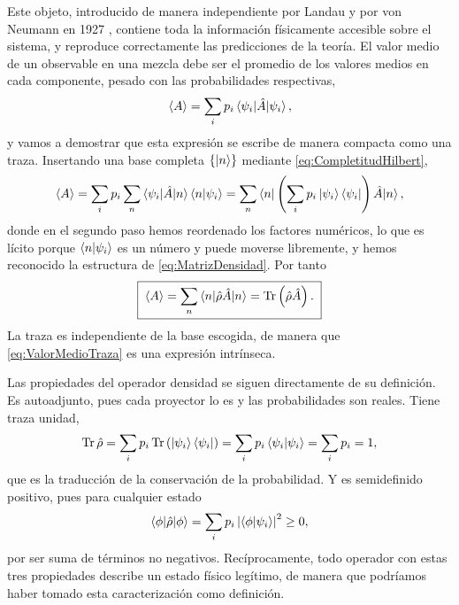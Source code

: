         Este objeto, introducido de manera independiente por Landau y por von Neumann en 1927 \citep{landau1927dampfungsproblem, vonneumann1927wahrscheinlichkeitstheoretischer}, contiene toda la información físicamente accesible sobre el sistema, y reproduce correctamente las predicciones de la teoría. El valor medio de un observable en una mezcla debe ser el promedio de los valores medios en cada componente, pesado con las probabilidades respectivas,
        \begin{equation}\label{eq:ValorMedioMezcla1}
            \left\langle A\right\rangle = \sum_{i}p_{i}\braket{\psi_{i}|\hat{A}|\psi_{i}},
        \end{equation}
        y vamos a demostrar que esta expresión se escribe de manera compacta como una traza. Insertando una base completa $\{\ket{n}\}$ mediante \eqref{eq:CompletitudHilbert},
        \begin{equation}\label{eq:ValorMedioMezcla2}
            \left\langle A\right\rangle = \sum_{i}p_{i}\sum_{n}\braket{\psi_{i}|\hat{A}|n}\braket{n|\psi_{i}}
            = \sum_{n}\braket{n|\left(\sum_{i}p_{i}\ket{\psi_{i}}\bra{\psi_{i}}\right)\hat{A}|n},
        \end{equation}
        donde en el segundo paso hemos reordenado los factores numéricos, lo que es lícito porque $\braket{n|\psi_{i}}$ es un número y puede moverse libremente, y hemos reconocido la estructura de \eqref{eq:MatrizDensidad}. Por tanto
        \begin{equation}\label{eq:ValorMedioTraza}
            \boxed{\;\left\langle A\right\rangle = \sum_{n}\braket{n|\hat{\rho}\hat{A}|n} = \mathrm{Tr}\left(\hat{\rho}\hat{A}\right) .\;}
        \end{equation}
        La traza es independiente de la base escogida, de manera que \eqref{eq:ValorMedioTraza} es una expresión intrínseca.

        Las propiedades del operador densidad se siguen directamente de su definición. Es autoadjunto, pues cada proyector lo es y las probabilidades son reales. Tiene traza unidad,
        \begin{equation}\label{eq:TrazaUno}
            \mathrm{Tr}\,\hat{\rho} = \sum_{i}p_{i}\,\mathrm{Tr}\left(\ket{\psi_{i}}\bra{\psi_{i}}\right) = \sum_{i}p_{i}\braket{\psi_{i}|\psi_{i}} = \sum_{i}p_{i} = 1,
        \end{equation}
        que es la traducción de la conservación de la probabilidad. Y es semidefinido positivo, pues para cualquier estado
        \begin{equation}\label{eq:PositividadRho}
            \braket{\phi|\hat{\rho}|\phi} = \sum_{i}p_{i}\left|\braket{\phi|\psi_{i}}\right|^{2} \geq 0,
        \end{equation}
        por ser suma de términos no negativos. Recíprocamente, todo operador con estas tres propiedades describe un estado físico legítimo, de manera que podríamos haber tomado esta caracterización como definición.

